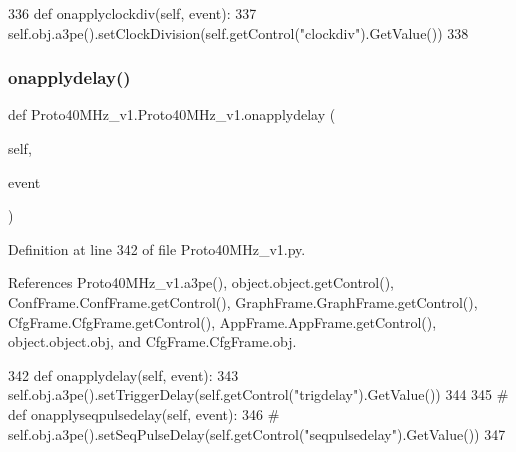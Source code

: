 \begin{DoxyCode}
336     \textcolor{keyword}{def }onapplyclockdiv(self, event):
337         self.obj.a3pe().setClockDivision(self.getControl(\textcolor{stringliteral}{"clockdiv"}).GetValue())
338 
\end{DoxyCode}
\mbox{\label{classProto40MHz__v1_1_1Proto40MHz__v1_a608b5e152da694d561a3e6e7d87a1b44}} 
\subsubsection{\texorpdfstring{onapplydelay()}{onapplydelay()}}
{\footnotesize\ttfamily def Proto40\+M\+Hz\+\_\+v1.\+Proto40\+M\+Hz\+\_\+v1.\+onapplydelay (\begin{DoxyParamCaption}\item[{}]{self,  }\item[{}]{event }\end{DoxyParamCaption})}



Definition at line 342 of file Proto40\+M\+Hz\+\_\+v1.\+py.



References Proto40\+M\+Hz\+\_\+v1.\+a3pe(), object.\+object.\+get\+Control(), Conf\+Frame.\+Conf\+Frame.\+get\+Control(), Graph\+Frame.\+Graph\+Frame.\+get\+Control(), Cfg\+Frame.\+Cfg\+Frame.\+get\+Control(), App\+Frame.\+App\+Frame.\+get\+Control(), object.\+object.\+obj, and Cfg\+Frame.\+Cfg\+Frame.\+obj.


\begin{DoxyCode}
342     \textcolor{keyword}{def }onapplydelay(self, event):
343         self.obj.a3pe().setTriggerDelay(self.getControl(\textcolor{stringliteral}{"trigdelay"}).GetValue())
344 
345 \textcolor{comment}{#    def onapplyseqpulsedelay(self, event):}
346 \textcolor{comment}{#        self.obj.a3pe().setSeqPulseDelay(self.getControl("seqpulsedelay").GetValue())}
347 
\end{DoxyCode}
\mbox{\label{classProto40MHz__v1_1_1Proto40MHz__v1_a294c942e8da1b356e4dfab6c3ac4c4bb}} 
